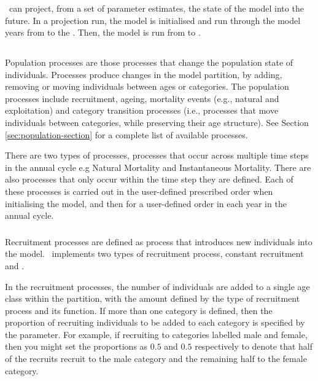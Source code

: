 \subsubsection{\label{sec:projections}}

\CAS\ can project, from a set of parameter estimates, the state of the model into the future. In a projection run, the model is initialised and run through the model years from  to the . Then, the model is run from  to . 


\subsection{}
\CH
Population processes are those processes that change the population state of individuals. Processes produce changes in the model partition, by adding, removing or moving individuals between ages or categories. The population processes include recruitment, ageing,  mortality events (e.g., natural and exploitation) and category transition processes (i.e., processes that move individuals between categories, while preserving their age structure). See Section \ref{sec:population-section} for a complete list of available processes.

There are two types of processes, processes that occur across multiple time steps in the annual cycle e.g Natural Mortality and Instantaneous Mortality. There are also processes that only occur within the time step they are defined. Each of these processes is carried out in the user-defined prescribed order when initialising the model, and then for a user-defined order in each year in the annual cycle. 

\subsubsection{}
\CH
Recruitment processes are defined as  process that introduces new individuals into the model. \CAS\ implements two types of recruitment process, constant recruitment and   \citep{1203}.

In the recruitment processes, the number of individuals are added to a single age class within the partition, with the amount defined by the type of recruitment process and its function. If more than one category is defined, then the proportion of recruiting individuals to be added to each category is specified by the  parameter. For example, if recruiting to categories labelled male and female, then you might set the proportions as $0.5$ and $0.5$ respectively to denote that half of the recruits recruit to the male category and the remaining half to the female category.

